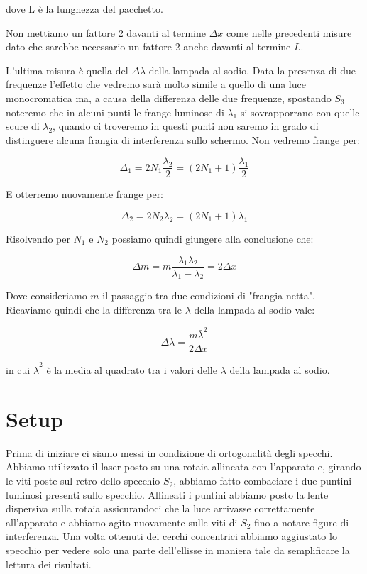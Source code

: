 \documentclass{article}
\begin{document}
dove L è la lunghezza del pacchetto.

Non mettiamo un fattore 2 davanti al termine $\Delta{x}$ come nelle precedenti misure dato che sarebbe necessario un fattore 2 anche davanti al termine $L$.

\vspace{3mm}

L'ultima misura è quella del $\Delta\lambda$ della lampada al sodio. Data la presenza di due frequenze l'effetto che vedremo sarà molto simile a quello di una luce monocromatica ma, a causa della differenza delle due frequenze, spostando $S_3$ noteremo che in alcuni punti le frange luminose di $\lambda_1$ si sovrapporrano con quelle scure di $\lambda_2$, quando ci troveremo in questi punti non saremo in grado di distinguere alcuna frangia di interferenza sullo schermo. Non vedremo frange per:

\begin{equation} 
\Delta_1 = 2 N_1 \frac{\lambda_2}{2} = (2 N_1 + 1) \frac{\lambda_1}{2} 
\end{equation}

E otterremo nuovamente frange per:

\begin{equation} 
\Delta_2 = 2N_2 \lambda_2 =(2 N_1 + 1) \lambda_1 
\end{equation}

Risolvendo per $N_1$ e $N_2$ possiamo quindi giungere alla conclusione che:

\begin{equation} 
\Delta m = m \frac{\lambda_1 \lambda_2}{\lambda_1 {-} \lambda_2} = 2 \Delta{x} 
\end{equation}

Dove consideriamo $m$ il passaggio tra due condizioni di "frangia netta". Ricaviamo quindi che la differenza tra le $\lambda$ della lampada al sodio vale:

\begin{equation} 
\Delta{\lambda} = \frac{m \bar \lambda^2}{2 \Delta{x}} 
\end{equation}

in cui $ \bar \lambda^2$ è la media al quadrato tra i valori delle $\lambda$ della lampada al sodio.




\section{Setup}
Prima di iniziare ci siamo messi in condizione di ortogonalità degli specchi. Abbiamo utilizzato il laser posto su una rotaia allineata con l'apparato e, girando le viti poste sul retro dello specchio $S_2$, abbiamo fatto combaciare i due puntini luminosi presenti sullo specchio. Allineati i puntini abbiamo posto la lente dispersiva sulla rotaia assicurandoci che la luce arrivasse correttamente all'apparato e abbiamo agito nuovamente sulle viti di $S_2$ fino a notare figure di interferenza. Una volta ottenuti dei cerchi concentrici abbiamo aggiustato lo specchio per vedere solo una parte dell'ellisse in maniera tale da semplificare la lettura dei risultati.
\end{document}
